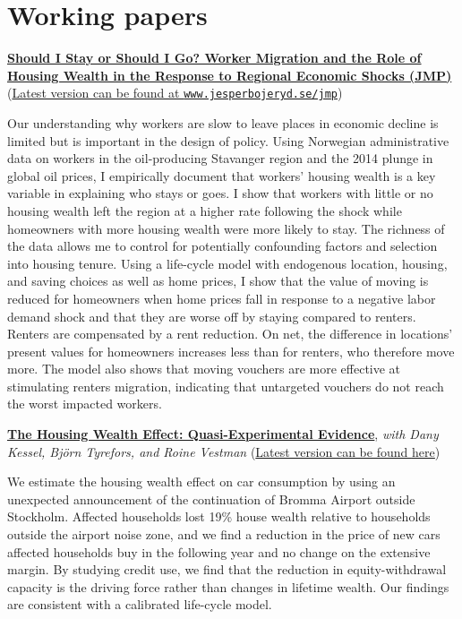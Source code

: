 \documentclass{clean_CV}
\begin{document}
\section{Working papers}


\href{https://www.jesperbojeryd.se/jmp}{\textbf{Should I Stay or Should I Go? Worker Migration and the Role of Housing Wealth in the Response to Regional Economic Shocks (JMP)}} (\href{https://www.jesperbojeryd.se/jmp}{Latest version can be found at \texttt{www.jesperbojeryd.se/jmp}})

Our understanding why workers are slow to leave places in economic decline is limited but is important in the design of policy. Using Norwegian administrative data on workers in the oil-producing Stavanger region and the 2014 plunge in global oil prices, I empirically document that workers' housing wealth is a key variable in explaining who stays or goes. I show that workers with little or no housing wealth left the region at a higher rate following the shock while homeowners with more housing wealth were more likely to stay. The richness of the data allows me to control for potentially confounding factors and selection into housing tenure. Using a life-cycle model with endogenous location, housing, and saving choices as well as home prices, I show that the value of moving is reduced for homeowners when home prices fall in response to a negative labor demand shock and that they are worse off by staying compared to renters. Renters are compensated by a rent reduction. On net, the difference in locations' present values for homeowners increases less than for renters, who therefore move more. The model also shows that moving vouchers are more effective at stimulating renters migration, indicating that untargeted vouchers do not reach the worst impacted workers.

\medskip

\Needspace{4cm}
\href{https://roinevestman.com/wp-content/uploads/2023/03/DP18034-compressed.pdf}{\textbf{The Housing Wealth Effect: Quasi-Experimental Evidence}}, \emph{with Dany Kessel, Björn Tyrefors, and Roine Vestman} (\href{https://roinevestman.com/wp-content/uploads/2023/03/DP18034-compressed.pdf}{Latest version can be found \underline{here}})

We estimate the housing wealth effect on car consumption by using an unexpected announcement of the continuation of Bromma Airport outside Stockholm. Affected households lost 19\% house wealth relative to households outside the airport noise zone, and we find a reduction in the price of new cars affected households buy in the following year and no change on the extensive margin. By studying credit use, we find that the reduction in equity-withdrawal capacity is the driving force rather than changes in lifetime wealth. Our findings are consistent with a calibrated life-cycle model.
\end{document}
